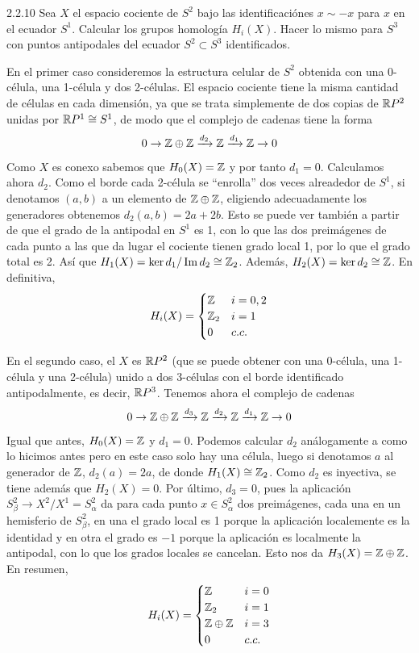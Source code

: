\documentclass[twoside]{article}
\begin{document}
\begin{ejercicio}{2.2.10}
Sea $X$ el espacio cociente de $S^2$ bajo las identificaciónes $x\sim-x$ para $x$ en el ecuador $S^1$. Calcular los grupos homología $H_i(X)$. Hacer lo mismo para $S^3$ con puntos antipodales del ecuador $S^2\subset S^3$ identificados. 
\end{ejercicio}
\begin{solucion}
En el primer caso consideremos la estructura celular de $S^2$ obtenida con una 0-célula, una 1-célula y dos 2-células. El espacio cociente tiene la misma cantidad de células en cada dimensión, ya que se trata simplemente de dos copias de $\mathbb{R} P^2$ unidas por $\mathbb{R} P^1\cong S^1$, de modo que el complejo de cadenas tiene la forma
\[
0\to \mathbb{Z}\oplus\mathbb{Z}\xrightarrow{d_2}\mathbb{Z}\xrightarrow{d_1}\mathbb{Z}\to 0
\]
Como $X$ es conexo sabemos que $H_0(X)=\mathbb{Z}$ y por tanto $d_1=0$. Calculamos ahora $d_2$. Como el borde cada 2-célula se ``enrolla'' dos veces alreadedor de $S^1$, si denotamos $(a,b)$ a un elemento de $\mathbb{Z}\oplus\mathbb{Z}$, eligiendo adecuadamente los generadores obtenemos $d_2(a,b)=2a+2b$. Esto se puede ver también a partir de que el grado de la antipodal en $S^1$ es 1, con lo que las dos preimágenes de cada punto a las que da lugar el cociente tienen grado local 1, por lo que el grado total es 2. Así que $H_1(X)=\ker{d_1}/\operatorname{Im}{d_2}\cong\mathbb{Z}_2$. Además, $H_2(X)=\ker{d_2}\cong\mathbb{Z}$. En definitiva,
\[
H_i(X)=\begin{cases}
\mathbb{Z} & i=0,2\\
\mathbb{Z}_2 & i=1\\
0 & c.c.
\end{cases}
\]

En el segundo caso, el $X$ es $\mathbb{R} P^2$ (que se puede obtener con una 0-célula, una 1-célula y una 2-célula) unido a dos 3-células con el borde identificado antipodalmente, es decir, $\mathbb{R} P^3$. Tenemos ahora el complejo de cadenas
\[
0\to\mathbb{Z}\oplus\mathbb{Z}\xrightarrow{d_3}\mathbb{Z}\xrightarrow{d_2}\mathbb{Z}\xrightarrow{d_1}\mathbb{Z}\to 0
\]
Igual que antes, $H_0(X)=\mathbb{Z}$ y $d_1=0$. Podemos calcular $d_2$ análogamente a como lo hicimos antes pero en este caso solo hay una célula, luego si denotamos $a$ al generador de $\mathbb{Z}$, $d_2(a)=2a$, de donde $H_1(X)\cong\mathbb{Z}_2$. Como $d_2$ es inyectiva, se tiene además que $H_2(X)=0$. Por último, $d_3=0$, pues la aplicación $S^2_{\beta}\to X^2/X^1=S^2_{\alpha}$ da para cada punto $x\in S^2_{\alpha}$ dos preimágenes, cada una en un hemisferio de $S^2_{\beta}$, en una el grado local es 1 porque la aplicación localemente es la identidad y en otra el grado es $-1$ porque la aplicación es localmente la antipodal, con lo que los grados locales se cancelan. Esto nos da $H_3(X)=\mathbb{Z}\oplus\mathbb{Z}$. En resumen,
\[
H_i(X)=\begin{cases}
\mathbb{Z} & i=0\\
\mathbb{Z}_2 & i=1\\
\mathbb{Z}\oplus\mathbb{Z} & i=3\\
0 & c.c.
\end{cases}
\]
\end{solucion}
\end{document}
